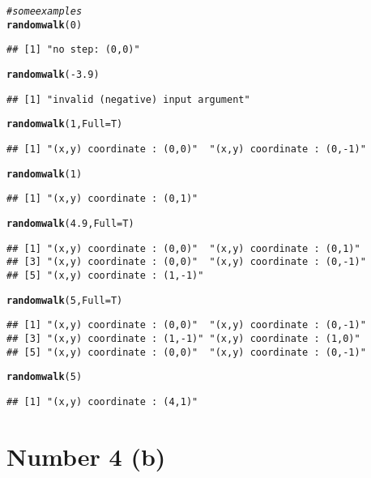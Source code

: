 \documentclass[english]{article}\usepackage[]{graphicx}\usepackage[]{color}
\makeatletter
\newcommand{\hlnum}[1]{\textcolor[rgb]{0.686,0.059,0.569}{#1}}%
\newcommand{\hlcom}[1]{\textcolor[rgb]{0.678,0.584,0.686}{\textit{#1}}}%
\newcommand{\hlopt}[1]{\textcolor[rgb]{0,0,0}{#1}}%
\newcommand{\hlstd}[1]{\textcolor[rgb]{0.345,0.345,0.345}{#1}}%
\newcommand{\hlkwc}[1]{\textcolor[rgb]{0.333,0.667,0.333}{#1}}%
\newcommand{\hlkwd}[1]{\textcolor[rgb]{0.737,0.353,0.396}{\textbf{#1}}}%
\newenvironment{kframe}{%
 \def\at@end@of@kframe{}%
 \ifinner\ifhmode%
  \def\at@end@of@kframe{\end{minipage}}%
  \begin{minipage}{\columnwidth}%
 \fi\fi%
 \def\FrameCommand##1{\hskip\@totalleftmargin \hskip-\fboxsep
 \colorbox{shadecolor}{##1}\hskip-\fboxsep
     \hskip-\linewidth \hskip-\@totalleftmargin \hskip\columnwidth}%
 \MakeFramed {\advance\hsize-\width
   \@totalleftmargin\z@ \linewidth\hsize
   \@setminipage}}%
 {\par\unskip\endMakeFramed%
 \at@end@of@kframe}
\newenvironment{knitrout}{}{} %
\makeatother
\begin{document}
\begin{knitrout}
\begin{kframe}
\begin{alltt}
\hlcom{#some examples}
\hlkwd{randomwalk}\hlstd{(}\hlnum{0}\hlstd{)}
\end{alltt}
\begin{verbatim}
## [1] "no step: (0,0)"
\end{verbatim}
\begin{alltt}
\hlkwd{randomwalk}\hlstd{(}\hlopt{-}\hlnum{3.9}\hlstd{)}
\end{alltt}
\begin{verbatim}
## [1] "invalid (negative) input argument"
\end{verbatim}
\begin{alltt}
\hlkwd{randomwalk}\hlstd{(}\hlnum{1}\hlstd{,}\hlkwc{Full}\hlstd{=T)}
\end{alltt}
\begin{verbatim}
## [1] "(x,y) coordinate : (0,0)"  "(x,y) coordinate : (0,-1)"
\end{verbatim}
\begin{alltt}
\hlkwd{randomwalk}\hlstd{(}\hlnum{1}\hlstd{)}
\end{alltt}
\begin{verbatim}
## [1] "(x,y) coordinate : (0,1)"
\end{verbatim}
\begin{alltt}
\hlkwd{randomwalk}\hlstd{(}\hlnum{4.9}\hlstd{,} \hlkwc{Full}\hlstd{=T)}
\end{alltt}
\begin{verbatim}
## [1] "(x,y) coordinate : (0,0)"  "(x,y) coordinate : (0,1)" 
## [3] "(x,y) coordinate : (0,0)"  "(x,y) coordinate : (0,-1)"
## [5] "(x,y) coordinate : (1,-1)"
\end{verbatim}
\begin{alltt}
\hlkwd{randomwalk}\hlstd{(}\hlnum{5}\hlstd{,}\hlkwc{Full}\hlstd{=T)}
\end{alltt}
\begin{verbatim}
## [1] "(x,y) coordinate : (0,0)"  "(x,y) coordinate : (0,-1)"
## [3] "(x,y) coordinate : (1,-1)" "(x,y) coordinate : (1,0)" 
## [5] "(x,y) coordinate : (0,0)"  "(x,y) coordinate : (0,-1)"
\end{verbatim}
\begin{alltt}
\hlkwd{randomwalk}\hlstd{(}\hlnum{5}\hlstd{)}
\end{alltt}
\begin{verbatim}
## [1] "(x,y) coordinate : (4,1)"
\end{verbatim}
\end{kframe}
\end{knitrout}


\section*{Number 4 (b)}
\end{document}
